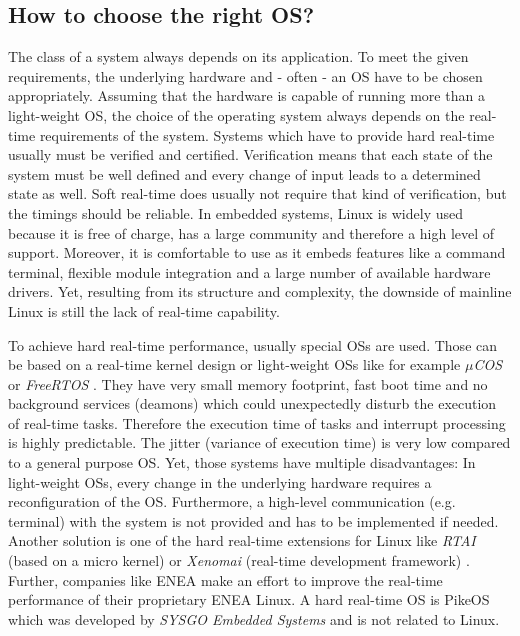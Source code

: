 \subsection{How to choose the right OS?}
The class of a system always depends on its application. To meet the given requirements,
the underlying hardware and - often - an OS have to be chosen appropriately. 
Assuming that the hardware is capable of running more than a light-weight OS, the choice of the operating
system always depends on the real-time requirements of the system. 
Systems which have to provide hard real-time usually must be verified and certified. 
Verification means that each state of the system must be well defined and every change of input leads to a
determined state as well.
Soft real-time does usually not require that kind of verification, but the timings should be reliable. 
In embedded systems, Linux is widely used because it is free of charge, has a large community and therefore a high level of support. 
Moreover, it is comfortable to use as it embeds features like a command terminal, flexible module integration and a large number of available hardware drivers.
Yet, resulting from its structure and complexity, the downside of mainline Linux is still the lack of real-time capability.
\par
To achieve hard real-time performance, usually special \acp{OS} are used. 
Those can be based on a real-time kernel design or light-weight \acp{OS} like for example \textit{$\mu$COS} \cite{micrium:microcos} or \textit{FreeRTOS} \cite{freertos}.
They have very small memory footprint, fast boot time and no background services (deamons) which could unexpectedly disturb the execution of real-time tasks. 
Therefore the execution time of tasks and interrupt processing is highly predictable.
The jitter (variance of execution time) is very low compared to a general purpose \ac{OS}.
Yet, those systems have multiple disadvantages:
In light-weight \acp{OS}, every change in the underlying hardware requires a reconfiguration of the OS.
Furthermore, a high-level communication (e.g. terminal) with the system is not provided and has to be implemented if needed. 
Another solution is one of the hard real-time extensions for Linux like \textit{\ac{RTAI}} (based on a micro kernel) \cite{rtai} or \textit{Xenomai} (real-time development framework) \cite{xenomai}.
Further, companies like ENEA \cite{stromblad:elfrtoemd} make an effort to improve the real-time performance of their proprietary ENEA Linux.  
A hard real-time \ac{OS} is PikeOS \cite{sysgo:prt} which was developed by \textit{SYSGO Embedded Systems} and is not related to Linux.

